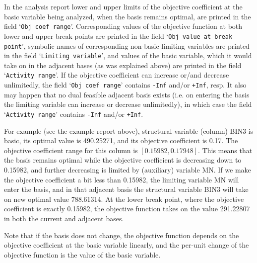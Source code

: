 In the analysis report lower and upper limits of the objective
coefficient at the basic variable being analyzed, when the basis
remains optimal, are printed in the field `{\tt Obj coef range}'.
Corresponding values of the objective function at both lower and upper
break points are printed in the field `{\tt Obj value at break point}',
symbolic names of corresponding non-basic limiting variables are
printed in the field `{\tt Limiting variable}', and values of the basic
variable, which it would take on in the adjacent bases (as was
explained above) are printed in the field `{\tt Activity range}'.
If the objective coefficient can increase or/and decrease unlimitedly,
the field `{\tt Obj coef range}' contains {\tt -Inf} and/or {\tt +Inf},
resp. It also may happen that no dual feasible adjacent basis exists
(i.e. on entering the basis the limiting variable can increase or
decrease unlimitedly), in which case the field `{\tt Activity range}'
contains {\tt -Inf} and/or {\tt +Inf}.

\newpage

For example (see the example report above), structural variable
(column) BIN3 is basic, its optimal value is 490.25271, and its
objective coefficient is 0.17. The objective coefficient range for this
column is $[0.15982,0.17948]$. This means that the basis remains
optimal while the objective coefficient is decreasing down to 0.15982,
and further decreasing is limited by (auxiliary) variable MN. If we
make the objective coefficient a bit less than 0.15982, the limiting
variable MN will enter the basis, and in that adjacent basis the
structural variable BIN3 will take on new optimal value 788.61314. At
the lower break point, where the objective coefficient is exactly
0.15982, the objective function takes on the value 291.22807 in both
the current and adjacent bases.

Note that if the basis does not change, the objective function depends
on the objective coefficient at the basic variable linearly, and the
per-unit change of the objective function is the value of the basic
variable.

